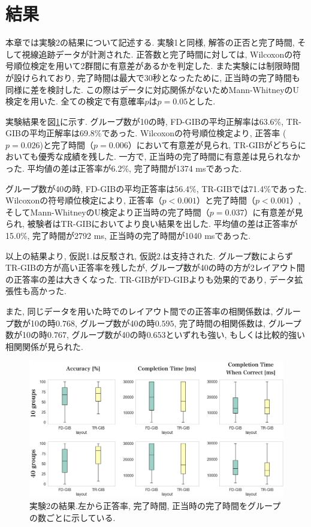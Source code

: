 \documentclass{kuee}
\begin{document}
\section{結果}
\label{sec:result-ex2}
本章では実験2の結果について記述する.
実験1と同様, 解答の正否と完了時間, そして視線追跡データが計測された.
正答数と完了時間に対しては, Wilcoxonの符号順位検定を用いて2群間に有意差があるかを判定した.
また実験には制限時間が設けられており, 完了時間は最大で30秒となったために, 正当時の完了時間も同様に差を検討した.
この際はデータに対応関係がないためMann-WhitneyのU検定を用いた.
全ての検定で有意確率$p$は$p = 0.05$とした.

実験結果を図\ref{fig:result-ex2}に示す.
グループ数が10の時, FD-GIBの平均正解率は63.6\%, TR-GIBの平均正解率は69.8\%であった.
Wilcoxonの符号順位検定より, 正答率 ($p=0.026$)と完了時間（$p=0.006$）において有意差が見られ, TR-GIBがどちらにおいても優秀な成績を残した.
一方で, 正当時の完了時間に有意差は見られなかった.
平均値の差は正答率が6.2\%, 完了時間が1374 msであった.

グループ数が40の時, FD-GIBの平均正答率は56.4\%, TR-GIBでは71.4\%であった.
Wilcoxonの符号順位検定により, 正答率（$p<0.001$）と完了時間（$p < 0.001$）, そしてMann-WhitneyのU検定より正当時の完了時間（$p = 0.037$）に有意差が見られ, 被験者はTR-GIBにおいてより良い結果を出した.
平均値の差は正答率が15.0\%, 完了時間が2792 ms, 正当時の完了時間が1040 msであった.

以上の結果より, 仮説1.は反駁され, 仮説2.は支持された.
グループ数によらずTR-GIBの方が高い正答率を残したが, グループ数が40の時の方が2レイアウト間の正答率の差は大きくなった.
TR-GIBがFD-GIBよりも効果的であり, データ拡張性も高かった.

また, 同じデータを用いた時でのレイアウト間での正答率の相関係数は, グループ数が10の時$0.768$, グループ数が40の時$0.595$, 完了時間の相関係数は, グループ数が10の時$0.767$, グループ数が40の時$0.653$といずれも強い, もしくは比較的強い相関関係が見られた.

\begin{figure}[t]
  \begin{center}
  \includegraphics[width=15cm]{./images/ex2-result.png}
  \caption{実験2の結果.左から正答率, 完了時間, 正当時の完了時間をグループの数ごとに示している. \label{fig:result-ex2}}
  \end{center}
\end{figure}
\end{document}
